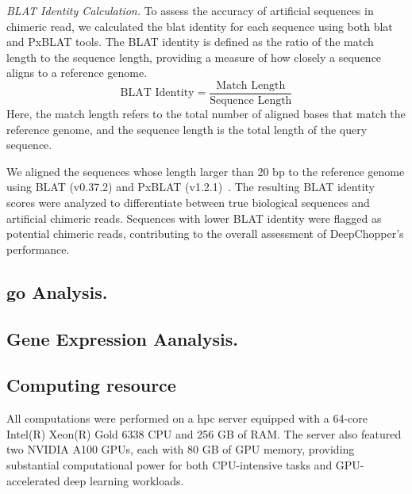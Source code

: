 \documentclass[pdflatex, sn-mathphys-num, lineno]{sn-jnl}%
\theoremstyle{thmstyleone}%
\theoremstyle{thmstyletwo}%
\theoremstyle{thmstylethree}%
\begin{document}
\textit{BLAT Identity Calculation.} To assess the accuracy of artificial sequences in chimeric read, we calculated the \gls{blat} identity for each sequence using both \gls{blat} and PxBLAT tools.
The BLAT identity is defined as the ratio of the match length to the sequence length, providing a measure of how closely a sequence aligns to a reference genome.
\[
\textrm{BLAT Identity} = \frac{\textrm{Match Length}}{\textrm{Sequence Length}}
\]
Here, the match length refers to the total number of aligned bases that match the reference genome, and the sequence length is the total length of the query sequence.

We aligned the sequences whose length larger than 20 bp to the reference genome using BLAT (v0.37.2) and PxBLAT (v1.2.1)~\cite{kent2002blat, li2024pxblat}.
The resulting BLAT identity scores were analyzed to differentiate between true biological sequences and artificial chimeric reads.
Sequences with lower BLAT identity were flagged as potential chimeric reads, contributing to the overall assessment of DeepChopper's performance.



\subsection{\gls{go} Analysis.}



\subsection{Gene Expression Aanalysis.}




\subsection{Computing resource}

All computations were performed on a \gls{hpc} server equipped with a 64-core Intel(R) Xeon(R) Gold 6338 CPU and 256 GB of RAM.
The server also featured two NVIDIA A100 GPUs, each with 80 GB of GPU memory, providing substantial computational power for both CPU-intensive tasks and GPU-accelerated deep learning workloads.



\end{document}
